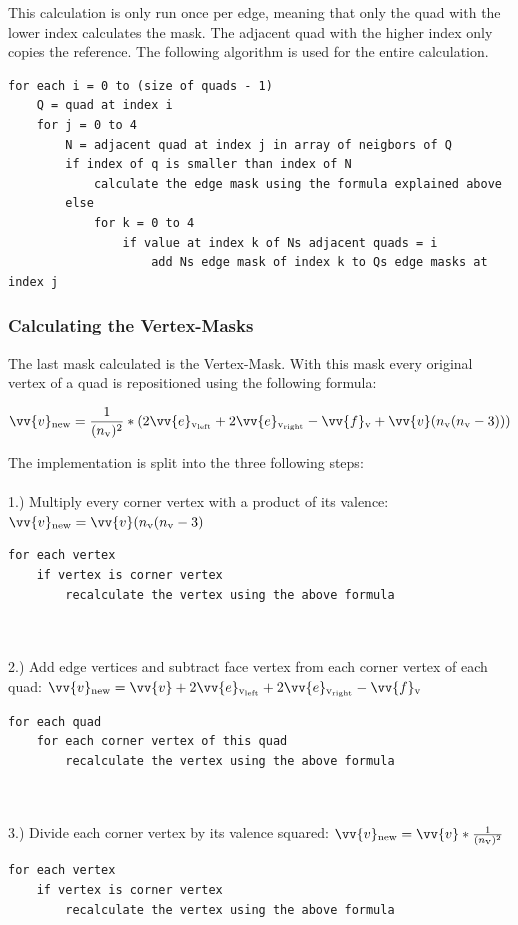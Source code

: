 \documentclass[12pt,a4paper]{scrartcl}
\begin{document}
This calculation is only run once per edge, meaning that only the quad with the lower index calculates the mask. The adjacent quad with the higher index only copies the reference. The following algorithm is used for the entire calculation.
\begin{lstlisting}[language=PSEUDO]
for each i = 0 to (size of quads - 1)
	Q = quad at index i
	for j = 0 to 4
		N = adjacent quad at index j in array of neigbors of Q
		if index of q is smaller than index of N
			calculate the edge mask using the formula explained above
		else
			for k = 0 to 4
				if value at index k of Ns adjacent quads = i
					add Ns edge mask of index k to Qs edge masks at index j		
\end{lstlisting} 

\subsubsection{Calculating the Vertex-Masks}
The last mask calculated is the Vertex-Mask. With this mask every original vertex of a quad is repositioned using the following formula:

$$ \vv{v}\textsubscript{new} = \frac{1}{(n\textsubscript{v})^{2}}*(2 \vv{e}\textsubscript{v\textsubscript{left}} + 2 \vv{e}\textsubscript{v\textsubscript{right}} - \vv{f}\textsubscript{v} +\vv{v} (n\textsubscript{v}(n\textsubscript{v}-3))) $$

The implementation is split into the three following steps:\\
\ \\
1.) Multiply every corner vertex with a product of its valence: $ \vv{v}\textsubscript{new} = \vv{v} (n\textsubscript{v}(n\textsubscript{v}-3)$
\begin{lstlisting}[language=PSEUDO]
for each vertex
	if vertex is corner vertex
		recalculate the vertex using the above formula
\end{lstlisting}
\ \\
\ \\
2.) Add edge vertices and subtract face vertex from each corner vertex of each quad: $\vv{v}\textsubscript{new} = \vv{v} + 2 \vv{e}\textsubscript{v\textsubscript{left}} + 2 \vv{e}\textsubscript{v\textsubscript{right}} - \vv{f}\textsubscript{v}$
\begin{lstlisting}[language=PSEUDO]
for each quad
	for each corner vertex of this quad
		recalculate the vertex using the above formula
\end{lstlisting}
\ \\
\ \\
3.) Divide each corner vertex by its valence squared: $ \vv{v}\textsubscript{new} = \vv{v} * \frac{1}{(n\textsubscript{v})^{2}}$
\begin{lstlisting}[language=PSEUDO]
for each vertex
	if vertex is corner vertex
		recalculate the vertex using the above formula
\end{lstlisting}
\end{document}

